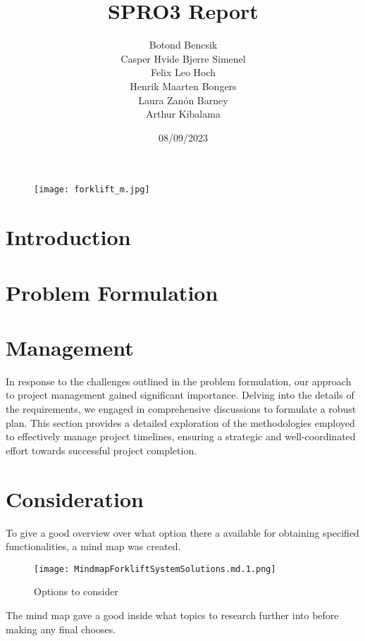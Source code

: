 \documentclass[11pt,table]{article}
\title{SPRO3 Report}
\date{08/09/2023}
\author{Botond Bencsik\\Casper Hvide Bjerre Simenel\\Felix Leo Hoch\\Henrik Maarten Bongers\\Laura Zanón Barney\\Arthur Kibalama}
\begin{document}
\maketitle
\begin{figure}[H]
    \texttt{[image: forklift\_m.jpg]}
\end{figure}
\newpage
\tableofcontents
\newpage
\section{Introduction}
      
\section{Problem Formulation}
    
    
    

    
    
\section{Management}
    In response to the challenges outlined in the problem formulation, our approach
    to project management gained significant importance. Delving into the details
    of the requirements, we engaged in comprehensive discussions to formulate a
    robust plan. This section provides a detailed exploration of the methodologies
    employed to effectively manage project timelines, ensuring a strategic and
    well-coordinated effort towards successful project completion.
    
    
    
    
    
\section{Consideration} 
    To give a good overview over what option there a available for obtaining
    specified functionalities, a mind map was created.
    \begin{figure}[H]
        \centering
        \texttt{[image: MindmapForkliftSystemSolutions.md.1.png]}
        \caption{Options to consider}
    \end{figure}   
    The mind map gave a good inside what topics to research further into before
    making any final chooses.
    
    
    
     
    
\end{document}

